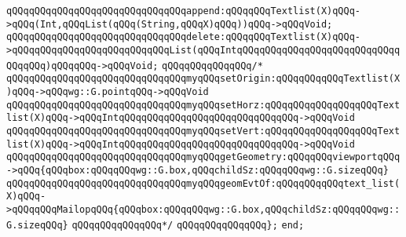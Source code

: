 \verb|qQQqqQQqqQQqqQQqqQQqqQQqqQQqqQQqappend:qQQqqQQqTextlist(X)qQQq->qQQq(Int,qQQqList(qQQq(String,qQQqX)qQQq))qQQq->qQQqVoid;|\newline
\verb|qQQqqQQqqQQqqQQqqQQqqQQqqQQqqQQqdelete:qQQqqQQqTextlist(X)qQQq->qQQqqQQqqQQqqQQqqQQqqQQqqQQqList(qQQqIntqQQqqQQqqQQqqQQqqQQqqQQqqQQqqQQqqQQq)qQQqqQQq->qQQqVoid;|\newline
\newline
\verb|qQQqqQQqqQQqqQQq/*|\newline
\verb|qQQqqQQqqQQqqQQqqQQqqQQqqQQqqQQqmyqQQqsetOrigin:qQQqqQQqqQQqTextlist(X)qQQq->qQQqwg::G.pointqQQq->qQQqVoid|\newline
\verb|qQQqqQQqqQQqqQQqqQQqqQQqqQQqqQQqmyqQQqsetHorz:qQQqqQQqqQQqqQQqqQQqTextlist(X)qQQq->qQQqIntqQQqqQQqqQQqqQQqqQQqqQQqqQQqqQQq->qQQqVoid|\newline
\verb|qQQqqQQqqQQqqQQqqQQqqQQqqQQqqQQqmyqQQqsetVert:qQQqqQQqqQQqqQQqqQQqTextlist(X)qQQq->qQQqIntqQQqqQQqqQQqqQQqqQQqqQQqqQQqqQQq->qQQqVoid|\newline
\newline
\verb|qQQqqQQqqQQqqQQqqQQqqQQqqQQqqQQqmyqQQqgetGeometry:qQQqqQQqviewportqQQq->qQQq{qQQqbox:qQQqqQQqwg::G.box,qQQqchildSz:qQQqqQQqwg::G.sizeqQQq}|\newline
\verb|qQQqqQQqqQQqqQQqqQQqqQQqqQQqqQQqmyqQQqgeomEvtOf:qQQqqQQqqQQqtext_list(X)qQQq->qQQqqQQqMailopqQQq{qQQqbox:qQQqqQQqwg::G.box,qQQqchildSz:qQQqqQQqwg::G.sizeqQQq}|\newline
\newline
\verb|qQQqqQQqqQQqqQQq*/|\newline
\verb|qQQqqQQqqQQqqQQq};|\newline
\verb|end;|\newline
\newline

